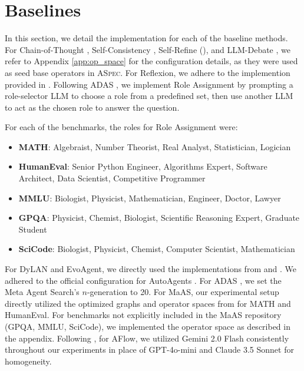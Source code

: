 \documentclass{article} %
\begin{document}
\section{Baselines}
\label{app:baselines}

In this section, we detail the implementation for each of the baseline methods. For Chain-of-Thought \citep{wei2022chain}, Self-Consistency \citep{wang2022self}, Self-Refine (\citep{madaan2023self}), and LLM-Debate \citep{du2023improving}, we refer to Appendix \ref{app:op_space} for the configuration details, as they were used as seed base operators in \textsc{ASpec}. For Reflexion, we adhere to the implemention provided in \citep{shinn2023reflexion}. Following ADAS \citep{hu2024automated}, we implement Role Assignment \citep{xu2023expertprompting} by prompting a role-selector LLM to choose a role from a predefined set, then use another LLM to act as the chosen role to answer the question. 

For each of the benchmarks, the roles for Role Assignment were:
\begin{itemize}
    \item \textbf{MATH}: Algebraist, Number Theorist, Real Analyst, Statistician, Logician
    \item \textbf{HumanEval}: Senior Python Engineer, Algorithms Expert, Software Architect, Data Scientist, Competitive Programmer
    \item \textbf{MMLU}: Biologist, Physicist, Mathematician, Engineer, Doctor, Lawyer
    \item \textbf{GPQA}: Physicist, Chemist, Biologist, Scientific Reasoning Expert, Graduate Student
    \item \textbf{SciCode}: Biologist, Physicist, Chemist, Computer Scientist, Mathematician
\end{itemize}

For DyLAN and EvoAgent, we directly used the implementations from \cite{liu2023dynamic} and \citep{yuan2024evoagent}. We adhered to the official configuration for AutoAgents \citep{chen2023autoagents}. For ADAS \citep{hu2024automated}, we set the Meta Agent Search's \(n\)-generation to 20. For MaAS, our experimental setup directly utilized the optimized graphs and operator spaces from \citep{zhang2025multi} for MATH and HumanEval. For benchmarks not explicitly included in the MaAS repository (GPQA, MMLU, SciCode), we implemented the operator space as described in the appendix. Following \citet{zhang2025multi}, for AFlow, we utilized Gemini 2.0 Flash consistently throughout our experiments in place of GPT-4o-mini and Claude 3.5 Sonnet for homogeneity.
\end{document}
